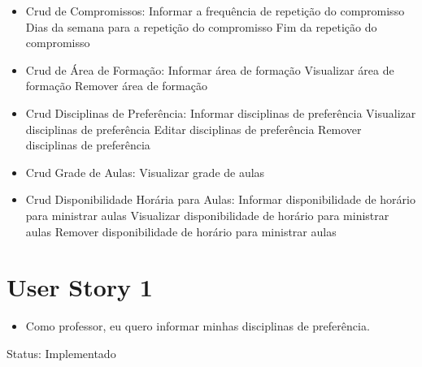 \documentclass{abnt}
\begin{document}
			\begin{itemize} 
			\item Crud de Compromissos:
			\subitem Informar a frequência de repetição do compromisso
			\subitem Dias da semana para a repetição do compromisso
			\subitem Fim da repetição do compromisso
			
			\item Crud de Área de Formação:
			\subitem Informar área de formação
			\subitem Visualizar área de formação
			\subitem Remover área de formação
			
			\item Crud Disciplinas de Preferência:
			\subitem Informar disciplinas de preferência
			\subitem Visualizar disciplinas de preferência
			\subitem Editar disciplinas de preferência
			\subitem Remover disciplinas de preferência
			
			\item Crud Grade de Aulas:
			\subitem Visualizar grade de aulas
			
			\item Crud Disponibilidade Horária para Aulas:
			\subitem Informar disponibilidade de horário para ministrar aulas
			\subitem Visualizar disponibilidade de horário para ministrar aulas
			\subitem Remover disponibilidade de horário para ministrar aulas
			
			\end{itemize}
			
	\clearpage
	\section{User Story 1}
	
		\begin{itemize}
			\item Como professor, eu quero informar minhas disciplinas de preferência.
		\end{itemize}
		
		Status: Implementado
		
\end{document}
